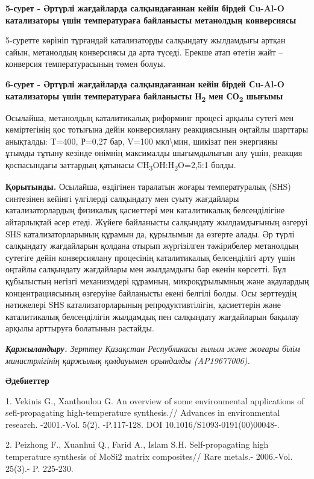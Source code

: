 {\bfseries 5-сурет - Әртүрлі жағдайларда салқындағаннан кейін бірдей
Сu-Al-O катализаторы үшін температураға байланысты метанолдың
конверсиясы}

5-суретте көрініп тұрғандай катализаторды салқындату жылдамдығы артқан
сайын, метанолдың конверсиясы да арта түседі. Ерекше атап өтетін жайт --
конверсия температурасының төмен болуы.

{\bfseries 6-сурет - Әртүрлі жағдайларда салқындағаннан кейін бірдей
Сu-Al-O катализаторы үшін температураға байланысты Н\textsubscript{2}
мен СО\textsubscript{2} шығымы}

Осылайша, метанолдың каталитикалық риформинг процесі арқылы сутегі мен
көміртегінің қос тотығына дейін конверсиялану реакциясының оңтайлы
шарттары анықталды: T=400, Р=0,27 бар, V=100 мкл\textbackslash мин,
шикізат пен энергияны ұтымды тұтыну кезінде өнімнің максималды
шығымдылығын алу үшін, реакция қоспасындағы заттардың қатынасы
CH\textsubscript{3}OH:H\textsubscript{2}O=2,5:1 болды.

{\bfseries Қорытынды.} Осылайша, өздігінен таралатын жоғары температуралық
(SНS) синтезінен кейінгі үлгілерді салқындату мен суыту жағдайлары
катализаторлардың физикалық қасиеттері мен каталитикалық белсенділігіне
айтарлықтай әсер етеді. Жүйеге байланысты салқындату жылдамдығының
өзгеруі SНS катализаторларының құрамын да, құрылымын да өзгерте алады.
Әр түрлі салқындату жағдайларын қолдана отырып жүргізілген тәжірибелер
метанолдың сутегіге дейін конверсиялану процесінің каталитикалық
белсенділігі арту үшін оңтайлы салқындату жағдайлары мен жылдамдығы бар
екенін көрсетті. Бұл құбылыстың негізгі механизмдері құрамның,
микроқұрылымның және ақаулардың концентрациясының өзгеруіне байланысты
екені белгілі болды. Осы зерттеудің нәтижелері SНS катализаторларының
репродуктивтілігін, қасиеттерін және каталитикалық белсенділігін
жылдамдық пен салқындату жағдайларын бақылау арқылы арттыруға болатынын
растайды.

\emph{{\bfseries Қаржыландыру.} Зерттеу Қазақстан Республикасы ғылым және
жоғары білім министрлігінің қаржылық қолдауымен орындалды (AP19677006).}

{\bfseries Әдебиеттер}

1. Vekinis G., Xanthoulou G. An overview of some environmental
applications of sefl-propagating high-temperature synthesis.// Advances
in environmental research. -2001.-Vol. 5(2). -P.117-128. DOI
10.1016/S1093-0191(00)00048-.

2. Peizhong F., Xuanhui Q., Farid A., Islam S.H. Self-propagating high
temperature synthesis of MoSi2 matrix composites// Rare metals.-
2006.-Vol. 25(3).- P. 225-230.

